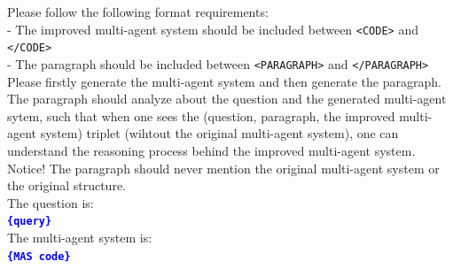 \documentclass{article}
\theoremstyle{plain}
\theoremstyle{definition}
\theoremstyle{remark}
\begin{document}
\begin{table}[h]
\begin{response}
Please follow the following format requirements:\\
- The improved multi-agent system should be included between \texttt{<CODE>} and \texttt{</CODE>}\\
- The paragraph should be included between \texttt{<PARAGRAPH>} and \texttt{</PARAGRAPH>}\\

Please firstly generate the multi-agent system and then generate the paragraph. The paragraph should analyze about the question and the generated multi-agent sytem, such that when one sees the (question, paragraph, the improved multi-agent system) triplet (wihtout the original multi-agent system), one can understand the reasoning process behind the improved multi-agent system. Notice! The paragraph should never mention the original multi-agent system or the original structure.\\

The question is:\\
\textbf{\textcolor{blue}{\texttt{\{query\}}}}\\

The multi-agent system is:\\
\textbf{\textcolor{blue}{\texttt{\{MAS code\}}}}
\end{response}
\end{table}
\end{document}
